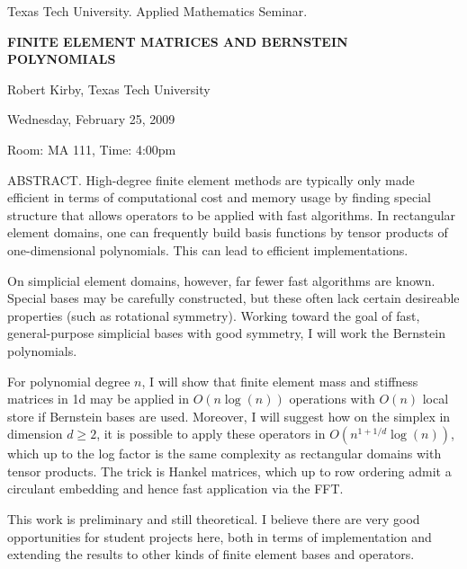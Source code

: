 \documentclass[oneside]{amsart}
\begin{document}
\begin{center}
Texas Tech University.  Applied Mathematics Seminar.

\end{center}

\begin{center}

{\LARGE \uppercase{\textbf{
Finite element matrices and Bernstein polynomials
}}}

Robert Kirby, Texas Tech University

Wednesday, February 25, 2009

Room: MA 111, Time: 4:00pm

\end{center}

ABSTRACT.
High-degree finite element methods are typically only made efficient  
in terms of computational cost and memory usage by finding special  
structure that allows operators to be applied with fast algorithms.   
In rectangular element domains, one can frequently build basis  
functions by tensor products of one-dimensional polynomials.  This can  
lead to efficient implementations.

On simplicial element domains, however, far fewer fast algorithms are  
known.  Special bases may be carefully constructed, but these often  
lack certain desireable properties (such as rotational symmetry).   
Working toward the goal of fast, general-purpose simplicial bases with  
good symmetry, I will work the Bernstein polynomials.

For polynomial degree $n$, I will show that finite element mass and  
stiffness matrices in 1d may be applied in $O(n \log(n))$ operations with  
$O(n)$ local store if Bernstein bases are used.  Moreover, I will  
suggest how on the simplex in dimension $d\ge 2$, it is possible to apply  
these operators in $O( n^{1+1/d} \log(n) )$, which up to the log factor  
is the same complexity as rectangular domains with tensor products.    
The trick is Hankel matrices, which up to row ordering admit a  
circulant embedding and hence fast application via the FFT.

This work is preliminary and still theoretical.  I believe there are  
very good opportunities for student projects here, both in terms of  
implementation and extending the results to other kinds of finite  
element bases and operators.
\end{document}
